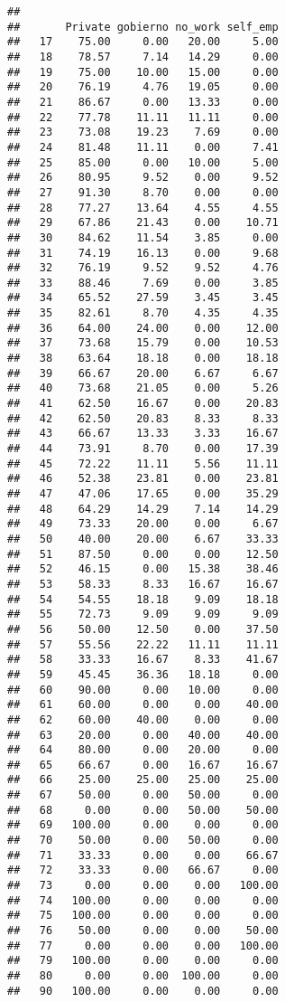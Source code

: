 \documentclass[]{article}
\begin{document}
\begin{verbatim}
##     
##       Private gobierno no_work self_emp
##   17    75.00     0.00   20.00     5.00
##   18    78.57     7.14   14.29     0.00
##   19    75.00    10.00   15.00     0.00
##   20    76.19     4.76   19.05     0.00
##   21    86.67     0.00   13.33     0.00
##   22    77.78    11.11   11.11     0.00
##   23    73.08    19.23    7.69     0.00
##   24    81.48    11.11    0.00     7.41
##   25    85.00     0.00   10.00     5.00
##   26    80.95     9.52    0.00     9.52
##   27    91.30     8.70    0.00     0.00
##   28    77.27    13.64    4.55     4.55
##   29    67.86    21.43    0.00    10.71
##   30    84.62    11.54    3.85     0.00
##   31    74.19    16.13    0.00     9.68
##   32    76.19     9.52    9.52     4.76
##   33    88.46     7.69    0.00     3.85
##   34    65.52    27.59    3.45     3.45
##   35    82.61     8.70    4.35     4.35
##   36    64.00    24.00    0.00    12.00
##   37    73.68    15.79    0.00    10.53
##   38    63.64    18.18    0.00    18.18
##   39    66.67    20.00    6.67     6.67
##   40    73.68    21.05    0.00     5.26
##   41    62.50    16.67    0.00    20.83
##   42    62.50    20.83    8.33     8.33
##   43    66.67    13.33    3.33    16.67
##   44    73.91     8.70    0.00    17.39
##   45    72.22    11.11    5.56    11.11
##   46    52.38    23.81    0.00    23.81
##   47    47.06    17.65    0.00    35.29
##   48    64.29    14.29    7.14    14.29
##   49    73.33    20.00    0.00     6.67
##   50    40.00    20.00    6.67    33.33
##   51    87.50     0.00    0.00    12.50
##   52    46.15     0.00   15.38    38.46
##   53    58.33     8.33   16.67    16.67
##   54    54.55    18.18    9.09    18.18
##   55    72.73     9.09    9.09     9.09
##   56    50.00    12.50    0.00    37.50
##   57    55.56    22.22   11.11    11.11
##   58    33.33    16.67    8.33    41.67
##   59    45.45    36.36   18.18     0.00
##   60    90.00     0.00   10.00     0.00
##   61    60.00     0.00    0.00    40.00
##   62    60.00    40.00    0.00     0.00
##   63    20.00     0.00   40.00    40.00
##   64    80.00     0.00   20.00     0.00
##   65    66.67     0.00   16.67    16.67
##   66    25.00    25.00   25.00    25.00
##   67    50.00     0.00   50.00     0.00
##   68     0.00     0.00   50.00    50.00
##   69   100.00     0.00    0.00     0.00
##   70    50.00     0.00   50.00     0.00
##   71    33.33     0.00    0.00    66.67
##   72    33.33     0.00   66.67     0.00
##   73     0.00     0.00    0.00   100.00
##   74   100.00     0.00    0.00     0.00
##   75   100.00     0.00    0.00     0.00
##   76    50.00     0.00    0.00    50.00
##   77     0.00     0.00    0.00   100.00
##   79   100.00     0.00    0.00     0.00
##   80     0.00     0.00  100.00     0.00
##   90   100.00     0.00    0.00     0.00
\end{verbatim}
\end{document}
